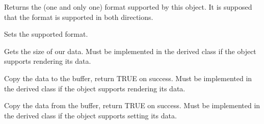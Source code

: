 \label{wxdataobjectsimplegetformat}


Returns the (one and only one) format supported by this object. It is supposed
that the format is supported in both directions.

\label{wxdataobjectsimplesetformat}


Sets the supported format.

\label{wxdataobjectsimplegetdatasize}


Gets the size of our data. Must be implemented in the derived class if the
object supports rendering its data.

\label{wxdataobjectsimplegetdatahere}


Copy the data to the buffer, return TRUE on success. Must be implemented in the
derived class if the object supports rendering its data.

\label{wxdataobjectsimplesetdata}


Copy the data from the buffer, return TRUE on success. Must be implemented in
the derived class if the object supports setting its data.


